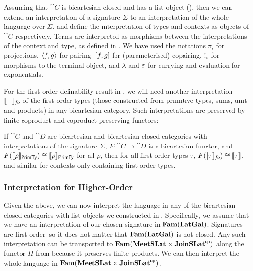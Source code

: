 Assuming that $\cat{C}$ is bicartesian closed and has a list object (), then we can extend an
interpretation of a signature $\Sigma$ to an interpretation of the whole language over
$\Sigma$.  and  define the interpretation of types and
contexts as objects of $\cat{C}$ respectively. Terms are interpreted as morphisms between the interpretations
of the context and type, as defined in . We have used the notations $\pi_i$ for
projections, $\langle f, g\rangle$ for pairing, $[f, g]$ for (parameterised) copairing, $!_x$ for morphisms
to the terminal object, and $\lambda$ and $\varepsilon$ for currying and evaluation for exponentials.

For the first-order definability result in , we will need another interpretation
$\llbracket - \rrbracket_{\mathit{fo}}$ of the first-order types (those constructed from primitive types, sums, unit and
products) in any bicartesian category. Such interpretations are preserved by finite coproduct and coproduct
preserving functors:

\begin{lemma}\label{lem:first-order-agreement-types}
  If $\cat{C}$ and $\cat{D}$ are bicartesian and bicartesian closed categories with interpretations of the
  signature $\Sigma$, $F : \cat{C} \to \cat{D}$ is a bicartesian functor, and
  $F(\llbracket \rho \rrbracket_{\mathsf{PrimTy}}) \cong \llbracket \rho \rrbracket_{\mathsf{PrimTy}}$ for all $\rho$, then for all first-order types $\tau$,
  $F(\llbracket \tau \rrbracket_{\mathit{fo}}) \cong \llbracket \tau \rrbracket$, and similar for contexts only containing first-order types.
\end{lemma}

\subsubsection{Interpretation for Higher-Order \GPS}
\label{sec:language:gps-interpretation}

Given the above, we can now interpret the language in any of the bicartesian closed categories with list
objects we constructed in . Specifically, we assume that we have an interpretation
of our chosen signature in $\mathbf{Fam}(\mathbf{LatGal})$. Signatures are first-order, so it does not matter that
$\mathbf{Fam}(\mathbf{LatGal})$ is not closed. Any such interpretation can be transported to
$\mathbf{Fam}(\mathbf{MeetSLat} \times \mathbf{JoinSLat}^{\mathsf{op}})$ along the functor $H$ from  because it preserves
finite products. We can then interpret the whole language in $\mathbf{Fam}(\mathbf{MeetSLat} \times \mathbf{JoinSLat}^{\mathsf{op}})$.

